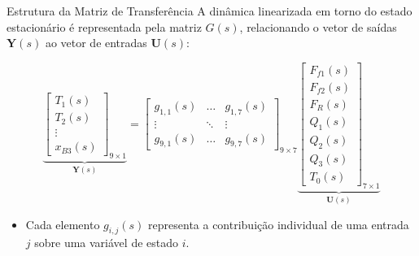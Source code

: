 \begin{frame}{Estrutura da Matriz de Transferência}
  A dinâmica linearizada em torno do estado estacionário é representada pela matriz $G(s)$, relacionando o vetor de saídas $\mathbf{Y}(s)$ ao vetor de entradas $\mathbf{U}(s)$:

  \begin{equation}
    \underbrace{
      \begin{bmatrix} T_1(s) \\ T_2(s) \\ \vdots \\ x_{B3}(s)
    \end{bmatrix}_{9 \times 1}}_{\mathbf{Y}(s)} =
    \begin{bmatrix}
      g_{1,1}(s) & \dots & g_{1,7}(s) \\
      \vdots & \ddots & \vdots \\
      g_{9,1}(s) & \dots & g_{9,7}(s)
    \end{bmatrix}_{9 \times 7}
    \underbrace{
      \begin{bmatrix} F_{f1}(s) \\ F_{f2}(s) \\ F_R(s) \\ Q_1(s) \\ Q_2(s) \\ Q_3(s) \\ T_0(s)
    \end{bmatrix}_{7 \times 1}}_{\mathbf{U}(s)}
  \end{equation}

  \begin{itemize}
    \item Cada elemento $g_{i,j}(s)$ representa a contribuição individual de uma entrada $j$ sobre uma variável de estado $i$.
  \end{itemize}
\end{frame}

